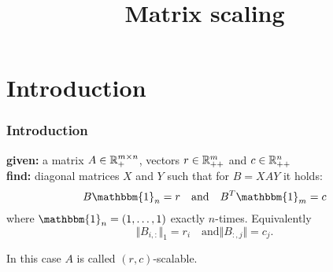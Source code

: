 \documentclass{beamer}
\title{Matrix scaling}
\begin{document}
\maketitle
\frame{\tableofcontents}

\section{Introduction}%

\begin{frame}
  \frametitle{Introduction}
  \textbf{given:} a matrix $A \in \mathbb{R}^{m\times n}_+$, vectors $r \in \mathbb{R}_{++}^m$ and $c \in \mathbb{R}^n_{++}$\\
  \textbf{find:} diagonal matrices $X$ and $Y$ such that for $B = XAY$ it holds:
  \begin{equation}
    B \mathbbm{1}_n = r \quad \text{and} \quad B^T \mathbbm{1}_m = c
  \end{equation}
  where $\mathbbm{1}_n = (1, \dots, 1)$ exactly $n$-times.
  Equivalently
  \begin{equation}
    \Vert B_{i,:} \Vert_1 = r_i \quad \text{and} \Vert B_{:, j} \Vert = c_j.
  \end{equation}

  \begin{block}{}
    \centering
    In this case $A$ is called $(r,c)$-scalable.
  \end{block}
\end{frame}
\end{document}
